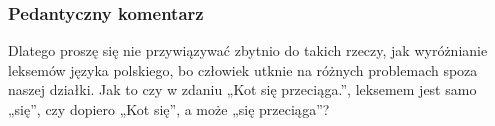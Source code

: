 \documentclass[10pt,t]{beamer}
\begin{document}














\begin{frame}
  \frametitle{Pedantyczny komentarz}




  Dlatego proszę się nie przywiązywać zbytnio do takich rzeczy, jak
  wyróżnianie leksemów języka polskiego, bo człowiek utknie na różnych
  problemach spoza naszej działki. Jak to czy w zdaniu „Kot się przeciąga.”,
  leksemem jest samo „się”, czy dopiero „Kot się”, a może „się przeciąga”?

\end{frame}
\end{document}
